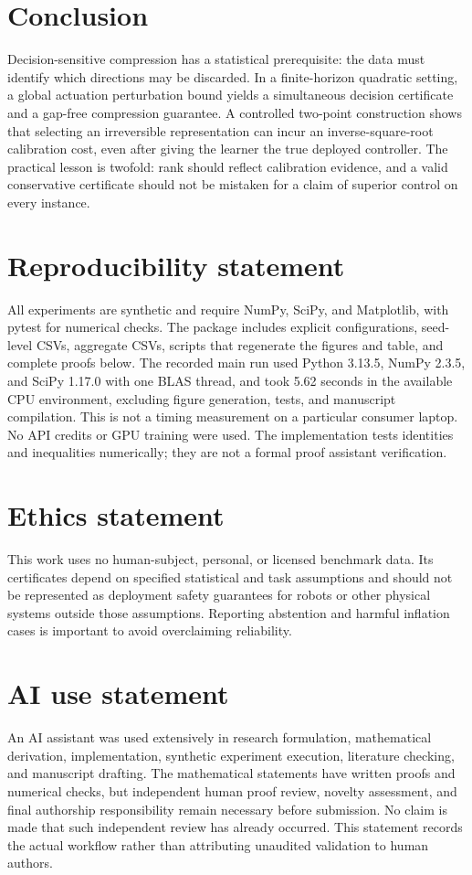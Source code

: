 \documentclass{article}
\begin{document}
\section{Conclusion}
Decision-sensitive compression has a statistical prerequisite: the data must identify which directions may be discarded. In a finite-horizon quadratic setting, a global actuation perturbation bound yields a simultaneous decision certificate and a gap-free compression guarantee. A controlled two-point construction shows that selecting an irreversible representation can incur an inverse-square-root calibration cost, even after giving the learner the true deployed controller. The practical lesson is twofold: rank should reflect calibration evidence, and a valid conservative certificate should not be mistaken for a claim of superior control on every instance.

\clearpage
\section*{Reproducibility statement}
All experiments are synthetic and require NumPy, SciPy, and Matplotlib, with pytest for numerical checks. The package includes explicit configurations, seed-level CSVs, aggregate CSVs, scripts that regenerate the figures and table, and complete proofs below. The recorded main run used Python 3.13.5, NumPy 2.3.5, and SciPy 1.17.0 with one BLAS thread, and took 5.62 seconds in the available CPU environment, excluding figure generation, tests, and manuscript compilation. This is not a timing measurement on a particular consumer laptop. No API credits or GPU training were used. The implementation tests identities and inequalities numerically; they are not a formal proof assistant verification.

\section*{Ethics statement}
This work uses no human-subject, personal, or licensed benchmark data. Its certificates depend on specified statistical and task assumptions and should not be represented as deployment safety guarantees for robots or other physical systems outside those assumptions. Reporting abstention and harmful inflation cases is important to avoid overclaiming reliability.

\section*{AI use statement}
An AI assistant was used extensively in research formulation, mathematical derivation, implementation, synthetic experiment execution, literature checking, and manuscript drafting. The mathematical statements have written proofs and numerical checks, but independent human proof review, novelty assessment, and final authorship responsibility remain necessary before submission. No claim is made that such independent review has already occurred. This statement records the actual workflow rather than attributing unaudited validation to human authors.
\end{document}
